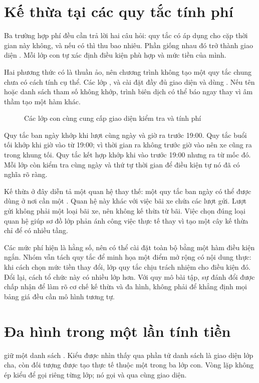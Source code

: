 \section{Kế thừa tại các quy tắc tính phí}
Ba trường hợp phí đều cần trả lời hai câu hỏi: quy tắc có áp dụng cho cặp thời gian này không, và nếu có thì thu bao nhiêu. Phần giống nhau đó trở thành giao diện . Mỗi lớp con tự xác định điều kiện phù hợp và mức tiền của mình.


Hai phương thức có  là thuần ảo, nên chương trình không tạo một quy tắc chung chưa có cách tính cụ thể. Các lớp ,  và  cài đặt đầy đủ giao diện và dùng . Nếu tên hoặc danh sách tham số không khớp, trình biên dịch có thể báo ngay thay vì âm thầm tạo một hàm khác.

\begin{figure}[H]
\centering

\caption{Các lớp con cùng cung cấp giao diện kiểm tra và tính phí}
\label{fig:pricing}
\end{figure}

Quy tắc ban ngày khớp khi lượt cùng ngày và giờ ra trước 19:00. Quy tắc buổi tối khớp khi giờ vào từ 19:00; vì thời gian ra không trước giờ vào nên xe cũng ra trong khung tối. Quy tắc kết hợp khớp khi vào trước 19:00 nhưng ra từ mốc đó. Mỗi lớp còn kiểm tra cùng ngày và thứ tự thời gian để điều kiện tự nó đã có nghĩa rõ ràng.

Kế thừa ở đây diễn tả một quan hệ thay thế: một quy tắc ban ngày có thể được dùng ở nơi cần một . Quan hệ này khác với việc bãi xe chứa các lượt gửi. Lượt gửi không phải một loại bãi xe, nên không kế thừa từ bãi. Việc chọn đúng loại quan hệ giúp sơ đồ lớp phản ánh công việc thực tế thay vì tạo một cây kế thừa chỉ để có nhiều tầng.

Các mức phí hiện là hằng số, nên có thể cài đặt toàn bộ bằng một hàm điều kiện ngắn. Nhóm vẫn tách quy tắc để minh họa một điểm mở rộng có nội dung thực: khi cách chọn mức tiền thay đổi, lớp quy tắc chịu trách nhiệm cho điều kiện đó. Đổi lại, cách tổ chức này có nhiều lớp hơn. Với quy mô bài tập, sự đánh đổi được chấp nhận để làm rõ cơ chế kế thừa và đa hình, không phải để khẳng định mọi bảng giá đều cần mô hình tương tự.

\section{Đa hình trong một lần tính tiền}
 giữ một danh sách . Kiểu được nhìn thấy qua phần tử danh sách là giao diện lớp cha, còn đối tượng được tạo thực tế thuộc một trong ba lớp con. Vòng lặp không ép kiểu để gọi riêng từng lớp; nó gọi  và  qua cùng giao diện.

